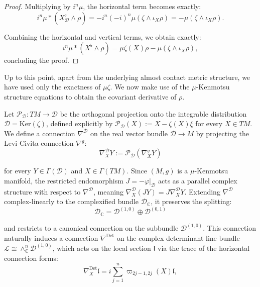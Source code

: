 \documentclass[10pt,a4paper,twoside,reqno]{amsart}
\theoremstyle{plain}
\theoremstyle{definition}
\theoremstyle{remark}
\renewcommand{\ker}{\mathrm{Ker}}
\begin{document}
\begin{proof}
\noindent
Multiplying by $i^n \mu$, the horizontal term becomes exactly:
\begin{equation*}
i^n \mu *(X_{\mathcal{D}}^{\flat} \wedge \rho) = - i^n (-i)^n \mu (\zeta \wedge \iota_X \rho) = - \mu(\zeta\wedge\iota_X\rho).
\end{equation*}

\noindent
Combining the horizontal and vertical terms, we obtain exactly:
\begin{equation*}
i^n \mu *(X^{\flat} \wedge \rho) = \mu\zeta(X)\rho - \mu(\zeta \wedge \iota_{X}\rho),
\end{equation*}
concluding the proof.
\end{proof}

\noindent
Up to this point, apart from the underlying almost contact metric structure, we have used only the exactness of $\mu\zeta$. We now make use of the $\mu$-Kenmotsu structure equations to obtain the covariant derivative of $\rho$.\medskip

\noindent
Let $\mathcal{P}_{\mathcal{D}} \colon TM \to \mathcal{D}$ be the orthogonal projection onto the integrable distribution $\mathcal{D} = \ker(\zeta)$, defined explicitly by $\mathcal{P}_{\mathcal{D}}(X) := X - \zeta(X)\xi$ for every $X\in TM$. We define a connection $\nabla^{\mathcal{D}}$ on the real vector bundle $\mathcal{D} \to M$ by projecting the Levi-Civita connection $\nabla^g$:
\begin{equation*}
\nabla^{\mathcal{D}}_X Y := \mathcal{P}_{\mathcal{D}}(\nabla^g_X Y)
\end{equation*}

\noindent
for every $Y \in \Gamma(\mathcal{D})$ and $X\in \Gamma(TM)$. Since $(M,g)$ is a $\mu$-Kenmotsu manifold, the restricted endomorphism $J = -\varphi\vert_{\mathcal{D}}$ acts as a parallel complex structure with respect to $\nabla^{\mathcal{D}}$, meaning $\nabla^{\mathcal{D}}_X (JY) = J \nabla^{\mathcal{D}}_X Y$. Extending $\nabla^{\mathcal{D}}$ complex-linearly to the complexified bundle $\mathcal{D}_{\mathbb{C}}$, it preserves the splitting: 
\begin{equation*}
\mathcal{D}_{\mathbb{C}} = \mathcal{D}^{(1,0)} \oplus \mathcal{D}^{(0,1)}
\end{equation*}

\noindent
and restricts to a canonical connection on the subbundle $\mathcal{D}^{(1,0)}$. This connection naturally induces a connection $\nabla^{\mathrm{Det}}$ on the complex determinant line bundle $\mathcal{L} \cong \wedge^n_{\mathbb{C}} \mathcal{D}^{(1,0)}$, which acts on the local section $\mathfrak{l}$ via the trace of the horizontal connection forms:
\begin{equation*}
\nabla^{\mathrm{Det}}_X \mathfrak{l} = i \sum_{j=1}^n \varpi_{2j-1,2j}(X) \mathfrak{l},
\end{equation*}
\end{document}
